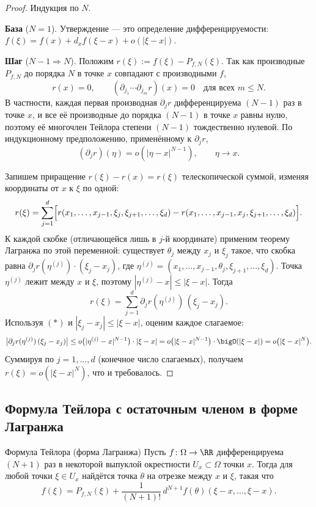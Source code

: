 \begin{proof}
	Индукция по $N$.

	\textbf{База} ($N=1$). Утверждение --- это определение дифференцируемости:
	$f(\xi)=f(x)+d_xf(\xi-x)+o(|\xi-x|)$.

	\textbf{Шаг} ($N-1\Rightarrow N$). Положим $r(\xi):=f(\xi)-P_{f,N}(\xi)$. Так как
	производные $P_{f,N}$ до порядка $N$ в точке $x$ совпадают с производными $f$,
	\[
	r(x)=0,\qquad
	(\partial_{j_1}\cdots\partial_{j_m} r)(x)=0\quad\text{для всех } m\le N.
	\]
	В частности, каждая первая производная $\partial_j r$ дифференцируема $(N-1)$ раз в
	точке $x$, и все её производные до порядка $(N-1)$ в точке $x$ равны нулю, поэтому
	её многочлен Тейлора степени $(N-1)$ тождественно нулевой. По индукционному
	предположению, применённому к $\partial_j r$,
	\[
	(\partial_j r)(\eta)=o(|\eta-x|^{N-1}),\qquad \eta\to x.
	\tag{$\ast$}
	\]

	Запишем приращение $r(\xi)-r(x)=r(\xi)$ телескопической суммой, изменяя координаты
	от $x$ к $\xi$ по одной:
	\[
	r(\xi)=\sum_{j=1}^{d}\Bigl[
	r(x_1,\dots,x_{j-1},\xi_j,\xi_{j+1},\dots,\xi_d)
	-r(x_1,\dots,x_{j-1},x_j,\xi_{j+1},\dots,\xi_d)\Bigr].
	\]
	К каждой скобке (отличающейся лишь в $j$-й координате) применим теорему Лагранжа по
	этой переменной: существует $\theta_j$ между $x_j$ и $\xi_j$ такое, что скобка равна
	$\partial_j r(\eta^{(j)})\cdot(\xi_j-x_j)$, где
	$\eta^{(j)}=(x_1,\dots,x_{j-1},\theta_j,\xi_{j+1},\dots,\xi_d)$. Точка $\eta^{(j)}$
	лежит между $x$ и $\xi$, поэтому $|\eta^{(j)}-x|\le|\xi-x|$. Тогда
	\[
	r(\xi)=\sum_{j=1}^{d}\partial_j r(\eta^{(j)})\,(\xi_j-x_j).
	\]
	Используя $(\ast)$ и $|\xi_j-x_j|\le|\xi-x|$, оценим каждое слагаемое:
	\[
	\bigl|\partial_j r(\eta^{(j)})\,(\xi_j-x_j)\bigr|
	\le o\bigl(|\eta^{(j)}-x|^{N-1}\bigr)\cdot|\xi-x|
	=o\bigl(|\xi-x|^{N-1}\bigr)\cdot \bigO(|\xi-x|)
	=o\bigl(|\xi-x|^{N}\bigr).
	\]
	Суммируя по $j=1,\dots,d$ (конечное число слагаемых), получаем
	$r(\xi)=o(|\xi-x|^N)$, что и требовалось.
\end{proof}

\subsection*{Формула Тейлора с остаточным членом в форме Лагранжа}

\begin{Theorem}{Формула Тейлора (форма Лагранжа)}{}
	Пусть $f\colon\Omega\to\RR$ дифференцируема $(N+1)$ раз в некоторой выпуклой
	окрестности $U_x\subset\Omega$ точки $x$. Тогда для любой точки $\xi\in U_x$
	найдётся точка $\theta$ на отрезке между $x$ и $\xi$, такая что
	\[
	f(\xi)=P_{f,N}(\xi)+\frac{1}{(N+1)!}\,d^{N+1}f(\theta)(\xi-x,\dots,\xi-x).
	\]
\end{Theorem}

